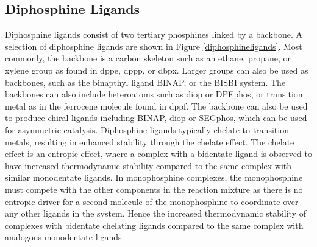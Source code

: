 
\subsection{Diphosphine Ligands}

Diphosphine ligands consist of two tertiary phosphines linked by a backbone.  A selection of diphosphine ligands are shown in Figure \ref{diphosphineligands}.  Most commonly, the backbone is a carbon skeleton such as an ethane, propane, or xylene group as found in \acrshort{dppe}, \acrshort{dppp}, or \acrshort{dbpx}.  Larger groups can also be used as backbones, such as the binapthyl ligand \acrshort{BINAP}, or the \acrshort{BISBI} system.  The backbones can also include heteroatoms such as \acrshort{diop} or \acrshort{DPEphos}, or transition metal as in the ferrocene molecule found in \acrshort{dppf}.  The backbone can also be used to produce chiral ligands including \acrshort{BINAP}, \acrshort{diop} or \acrshort{SEGphos}, which can be used for asymmetric catalysis.\cite{Noyori2002, Agbossou1995, Shimizu2007}  Diphosphine ligands typically chelate to transition metals, resulting in enhanced stability through the chelate effect.  The chelate effect is an entropic effect, where a complex with a bidentate ligand is observed to have increased thermodynamic stability compared to the same complex with similar monodentate ligands.\cite{Housecroft2005}  In monophosphine complexes, the monophosphine must compete with the other components in the reaction mixture as there is no entropic driver for a second molecule of the monophosphine to coordinate over any other ligands in the system.  Hence the increased thermodynamic stability of complexes with bidentate chelating ligands compared to the same complex with analogous monodentate ligands.  

